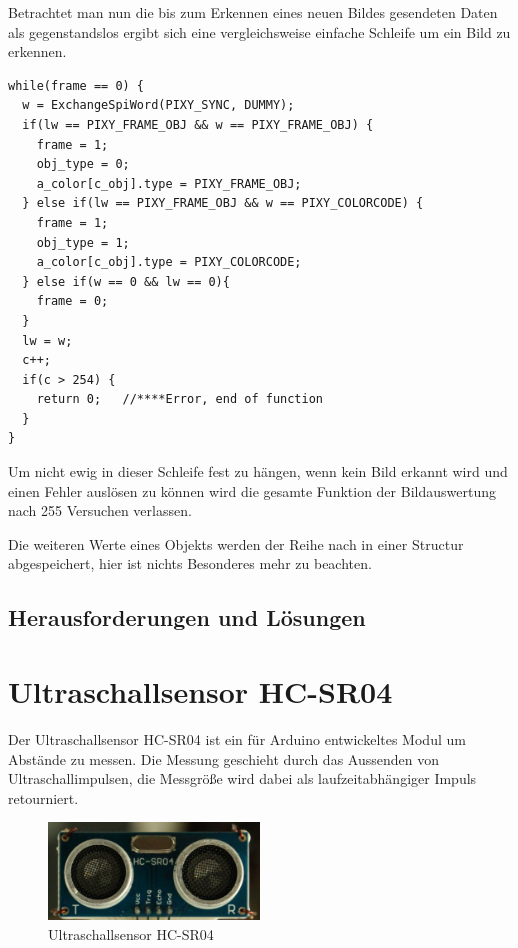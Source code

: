     Betrachtet man nun die bis zum Erkennen eines neuen Bildes gesendeten Daten als gegenstandslos ergibt sich eine vergleichsweise einfache Schleife um ein Bild zu erkennen.

    \lstset{language = c}
    \begin{lstlisting}
while(frame == 0) {
  w = ExchangeSpiWord(PIXY_SYNC, DUMMY);
  if(lw == PIXY_FRAME_OBJ && w == PIXY_FRAME_OBJ) {
    frame = 1;
    obj_type = 0;
    a_color[c_obj].type = PIXY_FRAME_OBJ;
  } else if(lw == PIXY_FRAME_OBJ && w == PIXY_COLORCODE) {
    frame = 1;
    obj_type = 1;
    a_color[c_obj].type = PIXY_COLORCODE;
  } else if(w == 0 && lw == 0){
    frame = 0;
  }
  lw = w;
  c++;
  if(c > 254) {
    return 0;	//****Error, end of function
  }
}
    \end{lstlisting}
    Um nicht ewig in dieser Schleife fest zu hängen, wenn kein Bild erkannt wird und einen Fehler auslösen zu können wird die gesamte Funktion der Bildauswertung
    nach 255 Versuchen verlassen.

    Die weiteren Werte eines Objekts werden der Reihe nach in einer Structur abgespeichert, hier ist nichts Besonderes mehr zu beachten.

  \subsection{Herausforderungen und Lösungen}

\section{Ultraschallsensor HC-SR04}
Der Ultraschallsensor HC-SR04 ist ein für Arduino entwickeltes Modul um Abstände zu messen. Die Messung geschieht durch das Aussenden von Ultraschallimpulsen,
die Messgröße wird dabei als laufzeitabhängiger Impuls retourniert.

\begin{figure}[tbh]
  \begin{centering}
    \includegraphics[width = 0.5\textwidth]{Bilder/Ultraschallsensor}
  \par\end{centering}
  \caption{Ultraschallsensor HC-SR04}
  \label{Ultraschallsensor}
\end{figure}

